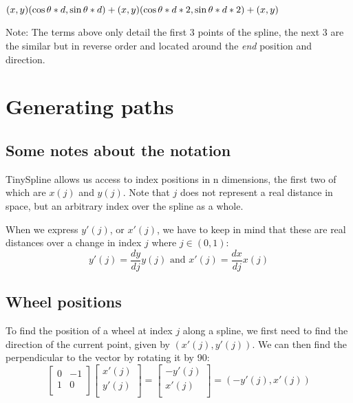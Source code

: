 \documentclass[12pt, english]{article}
\begin{document}
\noindent
\begin{math}
(x, y) \\
(\cos{\theta} * d, \sin{\theta} * d) + (x, y) \\
(\cos{\theta} * d * 2, \sin{\theta} * d * 2) + (x, y) \\
\end{math}

Note: The terms above only detail the first 3 points of the spline, the next 3 are the similar but in reverse order and located around the \textit{end} position and direction.

\section{Generating paths}
\subsection{Some notes about the notation}
TinySpline allows us access to index positions in n dimensions, the first two of which are $x(j)$ and $y(j)$. Note that $j$ does not represent a real distance in space, but an arbitrary index over the spline as a whole. 

When we express $y'(j)$, or $x'(j)$, we have to keep in mind that these are real distances over a change in index $j$ where $j \in (0,1)$:
\begin{equation}
	y'(j) = \frac{dy}{dj} y(j) \text{  and  } x'(j) = \frac{dx}{dj} x(j) 
\end{equation}

\subsection{Wheel positions}
To find the position of a wheel at index $j$ along a spline, we first need to find the direction of the current point, given by $(x'(j), y'(j))$. We can then find the perpendicular to the vector by rotating it by 90\degree: \\

\begin{equation}
	\begin{bmatrix}
		0 & -1 \\
		1 & 0 \\
	\end{bmatrix}
	\begin{bmatrix}
		x'(j)\\
		y'(j)\\
	\end{bmatrix}
	=
	\begin{bmatrix}
		-y'(j)\\
		x'(j)\\
	\end{bmatrix}
	= (-y'(j), x'(j)) 
\end{equation}
\end{document}
